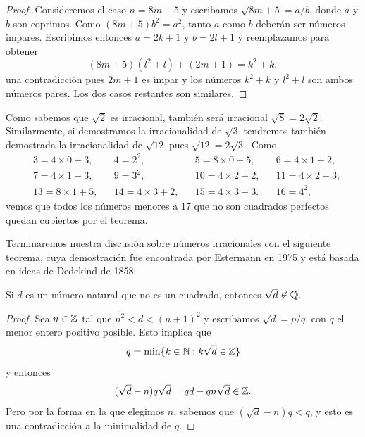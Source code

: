 \begin{proof}
	Consideremos el caso $n=8m+5$ y escribamos $\sqrt{8m+5}=a/b$, donde $a$ y
	$b$ son coprimos. Como $(8m+5)b^2=a^2$, tanto $a$ como $b$ deberán ser
	números impares. Escribimos entonces $a=2k+1$ y $b=2l+1$ y reemplazamos
	para obtener 
	\[
		(8m+5)(l^2+l)+(2m+1)=k^2+k,
	\]
	una contradicción pues $2m+1$ es impar y los números $k^2+k$ y
	$l^2+l$ son ambos números pares.  Los dos casos restantes son
	similares. 
\end{proof}

Como sabemos que $\sqrt{2}$ es irracional, también será irracional
$\sqrt{8}=2\sqrt{2}$.  Similarmente, si demostramos la irracionalidad de
$\sqrt{3}$ tendremos también demostrada la irracionalidad de $\sqrt{12}$ pues
$\sqrt{12}=2\sqrt{3}$. Como
\begin{align*}
	&3=4\times 0+3, 
	&&4=2^2,
	&& 5=8\times 0+5,
	&& 6=4\times 1+2,\\
	& 7=4\times 1+3,
	&& 9=3^2,
	&& 10=4\times 2+2,
	&& 11=4\times 2+3,\\
	& 13=8\times 1+5,
	&& 14=4\times 3+2,
	&& 15=4\times 3+3.
	&& 16=4^2,
\end{align*}
vemos que todos los números menores a 17 que no son cuadrados perfectos quedan
cubiertos por el teorema. 




Terminaremos nuestra discusión sobre números irracionales con el siguiente
teorema, cuya demostración fue encontrada por Estermann en 1975 y está basada
en ideas de Dedekind de 1858:

\begin{theorem}
	Si $d$ es un número natural que no es un cuadrado, entonces
	$\sqrt{d}\not\in\mathbb{Q}$.
\end{theorem}

\begin{proof}
	Sea $n\in\mathbb{Z}$ tal que $n^2<d<(n+1)^2$ y escribamos $\sqrt{d}=p/q$, con $q$ el menor
	entero positivo posible. Esto implica que 
	\[
	q=\min\{k\in\mathbb{N}:k\sqrt{d}\in\mathbb{Z}\}
	\]
	y entonces
	\[
		(\sqrt{d}-n)q\sqrt{d}=qd-qn\sqrt{d}\in\mathbb{Z}.
	\]
	Pero por la forma en la que elegimos $n$, sabemos que $(\sqrt{d}-n)q<q$, y
	esto es una contradicción a la minimalidad de $q$.
\end{proof}


